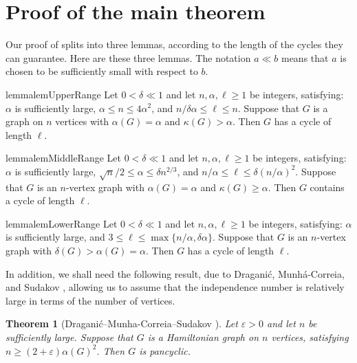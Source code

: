 \documentclass[11pt,english]{article}
\theoremstyle{plain}
\newtheorem{theorem}{Theorem}[section]
\theoremstyle{definition}
\theoremstyle{remark}
\newcommand{\eps}{\varepsilon}
\begin{document}
\section{Proof of the main theorem} \label{sec:main-proof}

	Our proof of  splits into three lemmas, according to the length of the cycles they can guarantee. Here are these three lemmas.
	The notation $a \ll b$ means that $a$ is chosen to be sufficiently small with respect to $b$.

	\begin{restatable}{lemma}{lemUpperRange} \label{lem:upper-range}
		Let $0 < \delta \ll 1$ and let $n, \alpha, \ell \ge 1$ be integers, satisfying: $\alpha$ is sufficiently large, $\alpha \le n \le 4\alpha^2$, and $n / \delta \alpha \le \ell \le n$.
		Suppose that $G$ is a graph on $n$ vertices with $\alpha(G) = \alpha$ and $\kappa(G) > \alpha$.
		Then $G$ has a cycle of length $\ell$.
	\end{restatable}

	\begin{restatable}{lemma}{lemMiddleRange} \label{lem:middle-range}
		Let $0 < \delta \ll 1$ and let $n, \alpha, \ell \ge 1$ be integers, satisfying: $\alpha$ is sufficiently large, $\sqrt{n}/2 \le \alpha \le \delta n^{2/3}$, and $n/\alpha \le \ell \le \delta (n/\alpha)^2$. Suppose that $G$ is an $n$-vertex graph with $\alpha(G) = \alpha$ and $\kappa(G) \ge \alpha$. Then $G$ contains a cycle of length $\ell$.
	\end{restatable}

	\begin{restatable}{lemma}{lemLowerRange} \label{lem:lower-range}
		Let $0 < \delta \ll 1$ and let $n, \alpha, \ell \ge 1$ be integers, satisfying: $\alpha$ is sufficiently large, and $3 \le \ell \le \max\{n/\alpha, \delta \alpha\}$.
		Suppose that $G$ is an $n$-vertex graph with $\delta(G) > \alpha(G) = \alpha$.
		Then $G$ has a cycle of length $\ell$.
	\end{restatable}

	In addition, we shall need the following result, due to Dragani\'c, Munh\'a-Correia, and Sudakov \cite{draganic2022pancyclicity}, allowing us to assume that the independence number is relatively large in terms of the number of vertices.

	\begin{theorem}[Dragani\'c--Munha-Correia--Sudakov \cite{draganic2022pancyclicity}] \label{thm:draganic1}
		Let $\eps > 0$ and let $n$ be sufficiently large. Suppose that $G$ is a Hamiltonian graph on $n$ vertices, satisfying $n \ge (2 + \eps)\alpha(G)^2$. Then $G$ is pancyclic.
	\end{theorem}
\end{document}
